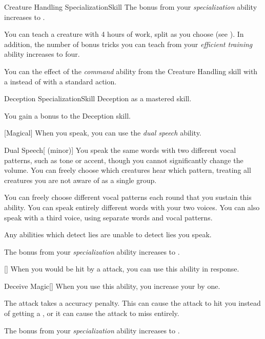 \begin{feat}{Creature Handling Specialization}{Skill}
         The bonus from your \textit{specialization} ability increases to .

         You can teach a creature with 4 hours of work, split as you choose (see ).
        In addition, the number of bonus tricks you can teach from your \textit{efficient training} ability increases to four.

         You can  the effect of the \textit{command} ability from the Creature Handling skill with a  instead of with a standard action.
    \end{feat}

    \begin{feat}{Deception Specialization}{Skill}
        \featpre Deception as a mastered skill.

         You gain a  bonus to the Deception skill.

        [Magical] When you speak, you can use the \textit{dual speech} ability.
        \begin{freeability}{Dual Speech}[ (minor)]
            You speak the same words with two different vocal patterns, such as tone or accent, though you cannot significantly change the volume.
            You can freely choose which creatures hear which pattern, treating all creatures you are not aware of as a single group. 

            You can freely choose different vocal patterns each round that you sustain this ability.
            \rankline
             You can speak entirely different words with your two voices.
             You can also speak with a third voice, using separate words and vocal patterns.
        \end{freeability}

         Any  abilities which detect lies are unable to detect lies you speak.

         The bonus from your \textit{specialization} ability increases to .

        [] When you would be hit by a  attack, you can use this ability in response.
        \begin{freeability}{Deceive Magic}[]
            When you use this ability, you increase your  by one.

            The attack takes a  accuracy penalty.
            This can cause the attack to hit you instead of getting a , or it can cause the attack to miss entirely.
        \end{freeability}

         The bonus from your \textit{specialization} ability increases to .
    \end{feat}

